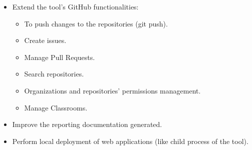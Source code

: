 \begin{itemize}
	\item Extend the tool's GitHub functionalities:
	\begin{itemize}
		\item To push changes to the repositories (git push).
		\item Create issues.
		\item Manage Pull Requests.
		\item Search repositories.
		\item Organizations and repositories' permissions management.
		\item Manage Classrooms.
	\end{itemize}
	\item Improve the reporting documentation generated.
	\item Perform local deployment of web applications (like child process of the tool).
\end{itemize}


